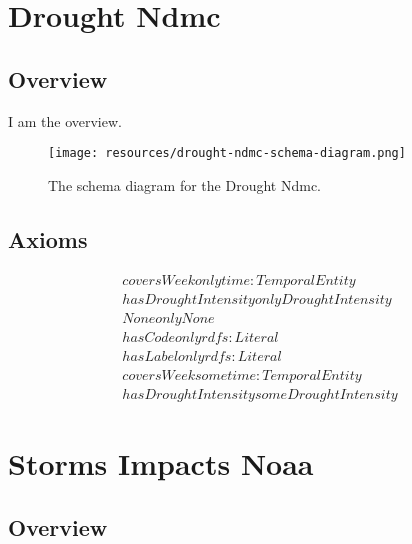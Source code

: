 
\section{Drought Ndmc}
\label{sec:drought-ndmc}
\subsection{Overview}
\label{ssec:overview}

I am the overview.

\begin{figure}[h!]
  \begin{center}
    \texttt{[image: resources/drought-ndmc-schema-diagram.png]}
  \end{center}
  \caption{The schema diagram for the Drought Ndmc.}
  \label{fig:ov-diagram}
\end{figure}


\subsection{Axioms}
\begin{align}
  coversWeek only time:TemporalEntity \\
  hasDroughtIntensity only DroughtIntensity \\
  None only None \\
  hasCode only rdfs:Literal \\
  hasLabel only rdfs:Literal \\
  coversWeek some time:TemporalEntity \\
  hasDroughtIntensity some DroughtIntensity \end{align}



\section{Storms Impacts Noaa}
\label{sec:storms-impacts-noaa}
\subsection{Overview}
\label{ssec:overview}

